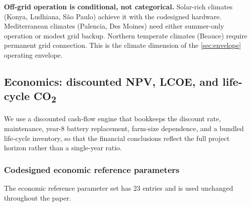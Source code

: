 \documentclass[11pt,a4paper]{article}
\begin{document}
\textbf{Off-grid operation is conditional, not categorical.} Solar-rich climates (Konya, Ludhiana, São Paulo) achieve it with the codesigned hardware. Mediterranean climates (Palencia, Des Moines) need either summer-only operation or modest grid backup. Northern temperate climates (Beauce) require permanent grid connection. This is the climate dimension of the \cref{sec:envelope} operating envelope.

\subsection{Economics: discounted NPV, LCOE, and life-cycle CO\textsubscript{2}}\label{sec:economics}

We use a discounted cash-flow engine that bookkeeps the discount rate, maintenance, year-8 battery replacement, farm-size dependence, and a bundled life-cycle inventory, so that the financial conclusions reflect the full project horizon rather than a single-year ratio.

\subsubsection{Codesigned economic reference parameters}\label{sec:econ-params}

The economic reference parameter set has 23 entries and is used unchanged throughout the paper.
\end{document}
